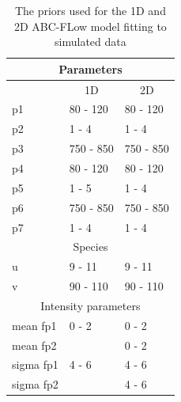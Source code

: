 


\begin{table}[tb]
\centering
\caption{The priors used for the 1D and 2D ABC-FLow model fitting to simulated data}
\label{tab:priors_model}

\begin{tabular}{@{}lll@{}}
\toprule
\multicolumn{3}{c}{Parameters}                                         \\ \midrule
\multicolumn{1}{c}{} & \multicolumn{1}{c}{1D} & \multicolumn{1}{c}{2D} \\ \midrule
p1                   & 80 - 120               & 80 - 120               \\
p2                   & 1 - 4                  & 1 - 4                  \\
p3                   & 750 - 850              & 750 - 850              \\
p4                   & 80 - 120               & 80 - 120               \\
p5                   & 1 - 5                  & 1 - 4                  \\
p6                   & 750 - 850              & 750 - 850              \\
p7                   & 1 - 4                  & 1 - 4                  \\ \midrule
\multicolumn{3}{c}{Species}                                            \\ \midrule
u                    & 9 - 11                 & 9 - 11                 \\
v                    & 90 - 110               & 90 - 110               \\ \midrule
\multicolumn{3}{c}{Intensity parameters}                               \\ \midrule
mean fp1             & 0 - 2                  & 0 - 2                  \\
mean fp2             &                   & 0 - 2                  \\
sigma fp1            & 4 - 6                  & 4 - 6                  \\
sigma fp2            &                   & 4 - 6                  \\ \bottomrule
\end{tabular}

\end{table}

